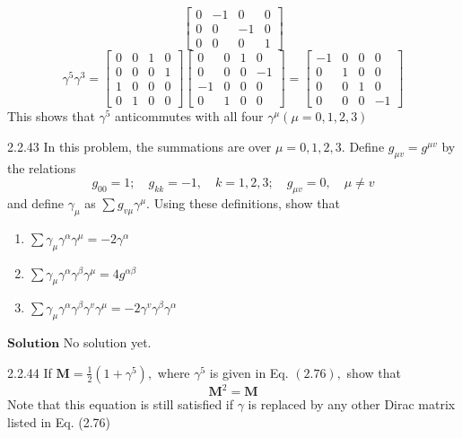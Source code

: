\documentclass{article}
\begin{document}
\begin{flushleft}
$$\begin{bmatrix}
0 & -1 & 0 & 0 \\
0 & 0 & -1 & 0 \\
0 & 0 & 0 & 1
\end{bmatrix}
$$
$$
\gamma^{5} \gamma^{3}=\begin{bmatrix}
0 & 0 & 1 & 0 \\
0 & 0 & 0 & 1 \\
1 & 0 & 0 & 0 \\
0 & 1 & 0 & 0
\end{bmatrix}\begin{bmatrix}
0 & 0 & 1 & 0 \\
0 & 0 & 0 & -1 \\
-1 & 0 & 0 & 0 \\
0 & 1 & 0 & 0
\end{bmatrix}=\begin{bmatrix}
-1 & 0 & 0 & 0 \\
0 & 1 & 0 & 0 \\
0 & 0 & 1 & 0 \\
0 & 0 & 0 & -1
\end{bmatrix}
$$
This shows that $\gamma^{5}$ anticommutes with all four $\gamma^{\mu}(\mu=0,1,2,3)$


\newpage

\begin{mybox}{2.2.43}
In this problem, the summations are over $\mu=0,1,2,3 .$ Define $g_{\mu v}=g^{\mu v}$ by the relations
$$
g_{00}=1 ; \quad g_{k k}=-1, \quad k=1,2,3 ; \quad g_{\mu v}=0, \quad \mu \neq v
$$
and define $\gamma_{\mu}$ as $\sum g_{v \mu} \gamma^{\mu} .$ Using these definitions, show that
\begin{enumerate}[$(a)$]
\item $\sum \gamma_{\mu} \gamma^{\alpha} \gamma^{\mu}=-2 \gamma^{\alpha}$
\item $\sum \gamma_{\mu} \gamma^{\alpha} \gamma^{\beta} \gamma^{\mu}=4 g^{\alpha \beta}$
\item $\sum \gamma_{\mu} \gamma^{\alpha} \gamma^{\beta} \gamma^{v} \gamma^{\mu}=-2 \gamma^{v} \gamma^{\beta} \gamma^{\alpha}$
\end{enumerate}
\end{mybox}

$\boxed{\textbf{Solution}}$ No solution yet.

\newpage

\begin{mybox}{2.2.44}
If $\mathbf{M}=\frac{1}{2}\left(1+\gamma^{5}\right),$ where $\gamma^{5}$ is given in Eq. $(2.76),$ show that
$$
\mathbf{M}^{2}=\mathbf{M}
$$
Note that this equation is still satisfied if $\gamma$ is replaced by any other Dirac matrix listed in Eq. (2.76) 
\end{mybox}



\end{flushleft}
\end{document}
